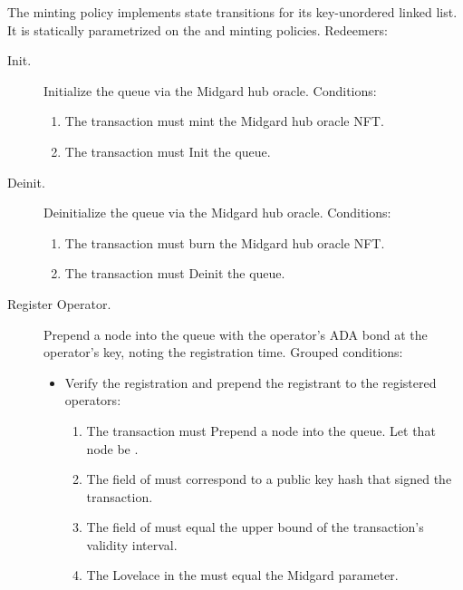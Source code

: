 \documentclass[../midgard.tex]{subfiles}
\begin{document}
The  minting policy implements state transitions for its key-unordered linked list.
It is statically parametrized on the  and  minting policies.
Redeemers:
\begin{description}
    \item[Init.] Initialize the  queue via the Midgard hub oracle.
      Conditions:
        \begin{enumerate}
            \item The transaction must mint the Midgard hub oracle NFT.
            \item The transaction must Init the  queue.
        \end{enumerate}
    \item[Deinit.] Deinitialize the  queue via the Midgard hub oracle.
      Conditions:
        \begin{enumerate}
            \item The transaction must burn the Midgard hub oracle NFT.
            \item The transaction must Deinit the  queue.
        \end{enumerate}
    \item[Register Operator.] Prepend a node into the  queue with the operator's ADA bond at the operator's key, noting the registration time.
      Grouped conditions:
        \begin{itemize}
            \item Verify the registration and prepend the registrant to the registered operators:
            \begin{enumerate}
                \item The transaction must Prepend a node into the  queue.
                  Let that node be .
                \item The  field of  must correspond to a public key hash that signed the transaction.
                \item The  field of  must equal the upper bound of the transaction's validity interval.
                \item The Lovelace in the  must equal the  Midgard parameter.
            \end{enumerate}

\end{itemize}
\end{description}
\end{document}
